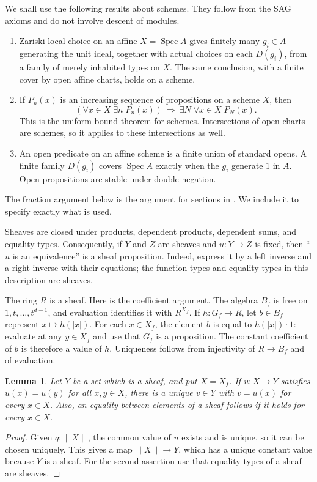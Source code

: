 \documentclass[11pt]{amsart}
\newtheorem{lemma}[theorem]{Lemma}
\theoremstyle{definition}
\newcommand{\Spec}{\operatorname{Spec}}
\newcommand{\tr}[1]{\lVert #1\rVert}
\begin{document}
We shall use the following results about schemes. They follow from the
SAG axioms and do not involve descent of modules.
\begin{enumerate}
\item Zariski-local choice on an affine $X=\Spec A$ gives finitely many
  $g_i\in A$ generating the unit ideal, together with actual choices on
  each $D(g_i)$, from a family of merely inhabited types on $X$.
  The same conclusion, with a finite cover by open affine charts, holds
  on a scheme.
\item If $P_n(x)$ is an increasing sequence of propositions on a scheme
  $X$, then
  \[
   (\forall x\in X\;\exists n\;P_n(x))
   \ \Longrightarrow\ \exists N\;\forall x\in X\;P_N(x).
  \]
  This is the uniform bound theorem for schemes. Intersections of open
  charts are schemes, so it applies to these intersections as well.
\item An open predicate on an affine scheme is a finite union of standard
  opens. A finite family $D(g_i)$ covers $\Spec A$ exactly when the $g_i$
  generate $1$ in $A$. Open propositions are stable under double negation.
\end{enumerate}
The fraction argument below is the argument for sections in
\cite[Section~7.1]{SAG}. We include it to specify exactly what is used.

Sheaves are closed under products, dependent products, dependent sums,
and equality types. Consequently, if $Y$ and $Z$ are sheaves and
$u:Y\to Z$ is fixed, then ``$u$ is an equivalence'' is a sheaf
proposition. Indeed, express it by a left inverse and a right inverse
with their equations; the function types and equality types in this
description are sheaves.

The ring $R$ is a sheaf. Here is the coefficient argument. The algebra
$B_f$ is free on $1,t,\ldots,t^{d-1}$, and evaluation identifies it with
$R^{X_f}$. If $h:G_f\to R$, let $b\in B_f$ represent
$x\mapsto h(|x|)$. For each $x\in X_f$, the element $b$ is equal to
$h(|x|)\cdot1$: evaluate at any $y\in X_f$ and use that $G_f$ is a
proposition. The constant coefficient of $b$ is therefore a value of
$h$. Uniqueness follows from injectivity of $R\to B_f$ and of evaluation.

\begin{lemma}\label{lem:constant}
Let $Y$ be a set which is a sheaf, and put $X=X_f$.
If $u:X\to Y$ satisfies $u(x)=u(y)$ for all $x,y\in X$, there is a
unique $v\in Y$ with $v=u(x)$ for every $x\in X$.
Also, an equality between elements of a sheaf follows if it holds for
every $x\in X$.
\end{lemma}
\begin{proof}
Given $q:\tr X$, the common value of $u$ exists and is unique, so it can
be chosen uniquely. This gives a map $\tr X\to Y$, which has a unique
constant value because $Y$ is a sheaf. For the second assertion use that
equality types of a sheaf are sheaves.
\end{proof}
\end{document}
